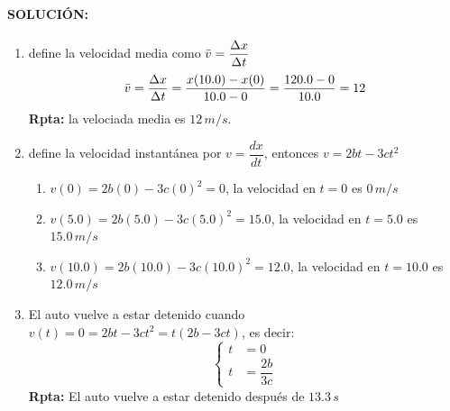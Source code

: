 \documentclass{utea-tarea}
\begin{document}
\paragraph{SOLUCIÓN:}
\begin{enumerate}
    \item \cite{Young2013} define la velocidad media como $\Bar{v} = \dfrac{\Delta x}{\Delta t}$
    $$\Bar{v} = \frac{\Delta x}{\Delta t} = \frac{x(10.0) - x(0)}{10.0 - 0} = \frac{120.0 - 0}{10.0} = 12$$
    \textbf{Rpta:} la velociada media es $12 \, m/s$.
    \item \cite{Young2013} define la velocidad instantánea por $v = \dfrac{dx}{dt}$, entonces $v=2bt - 3ct^2$
    \begin{enumerate}
        \item $v(0) =2b(0) - 3c(0)^2 = 0$, la velocidad en $t=0$ es $0 \, m/s$
        \item $v(5.0) =2b(5.0) - 3c(5.0)^2 = 15.0$, la velocidad en $t=5.0$ es $15.0 \, m/s$
        \item $v(10.0) =2b(10.0) - 3c(10.0)^2 = 12.0$, la velocidad en $t=10.0$ es $12.0 \, m/s$
    \end{enumerate}
    
    \item El auto vuelve a estar detenido cuando $v(t)=0=2bt - 3ct^2=t(2b - 3ct)$, es decir:
    $$\begin{cases}t &= 0 \\ t &= \dfrac{2b}{3c} \end{cases}$$
    \textbf{Rpta:} El auto vuelve a estar detenido después de $13.3 \, s$
\end{enumerate}



\end{document}
